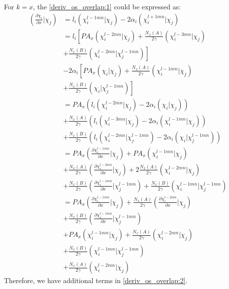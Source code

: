 For $k = x$, the \ref{deriv_os_overlap:1} could be expressed as:
\begin{equation}
 \begin{split}
 \left(\frac{\partial \chi_{i}}{\partial x}|\chi_{j}\right)  &= 
 l_{i}(\chi_{i}^{l-1mn}|\chi_{j}) - 2\alpha_{i} (\chi_{i}^{l+1mn}|\chi_{j}) \\
 &= l_{i}\left[ PA_{x}(\chi_{i}^{l-2mn}|\chi_{j}) + 
 \frac{N_{x}(A)}{2 \gamma}(\chi_{i}^{l-3mn}|\chi_{j})  \right. \\ 
 &+ \left. \frac{N_{x}(B)}{2 \gamma}(\chi_{i}^{l-2mn}|\chi_{j}^{l-1mn})
 \right] \\
 &-2\alpha_{i} \left[ PA_{x}(\chi_{i}|\chi_{j}) + 
 \frac{N_{x}(A)}{2 \gamma}(\chi_{i}^{l-1mn}|\chi_{j}) \right. \\ 
 &+ \left. \frac{N_{x}(B)}{2 \gamma}(\chi_{i}|\chi_{j}^{l-1mn})
 \right] \\
 &= PA_{x} \left( l_{i}(\chi_{i}^{l-2mn}|\chi_{j}) -2\alpha_{i} (\chi_{i}|\chi_{j}) 
 \right) \\
 &+ \frac{N_{x}(A)}{2 \gamma}\left(
 l_{i}(\chi_{i}^{l-3mn}|\chi_{j}) -2\alpha_{i} (\chi_{i}^{l-1mn}|\chi_{j})
 \right) \\
 &+ \frac{N_{x}(B)}{2 \gamma}\left(
 l_{i}(\chi_{i}^{l-2mn}|\chi_{j}^{l-1mn}) -2\alpha_{i} (\chi_{i}|\chi_{j}^{l-1mn})
 \right) \\
 &= PA_{x} (\frac{\partial \chi_{i}^{l-1mn}}{\partial x}|\chi_{j}) + 
 PA_{x} (\chi_{i}^{l-1mn}|\chi_{j}) \\
 &+ \frac{N_{x}(A)}{2 \gamma}(\frac{\partial \chi_{i}^{l-2mn}}{\partial x}|\chi_{j})
 + 2\frac{N_{x}(A)}{2 \gamma}(\chi_{i}^{l-2mn}|\chi_{j}) \\
 &+ \frac{N_{x}(B)}{2 \gamma}(\frac{\partial \chi_{i}^{l-1mn}}{\partial x}|\chi_{j}^{l-1mn})
 + \frac{N_{x}(B)}{2 \gamma}(\chi_{i}^{l-1mn}|\chi_{j}^{l-1mn}) \\
 &= PA_{x} (\frac{\partial \chi_{i}^{l-1mn}}{\partial x}|\chi_{j}) + 
 \frac{N_{x}(A)}{2 \gamma}(\frac{\partial \chi_{i}^{l-2mn}}{\partial x}|\chi_{j}) \\
 &+ \frac{N_{x}(B)}{2 \gamma}(\frac{\partial \chi_{i}^{l-1mn}}{\partial x}|\chi_{j}^{l-1mn}) \\
 &+ PA_{x} (\chi_{i}^{l-1mn}|\chi_{j}) + \frac{N_{x}(A)}{2 \gamma}(\chi_{i}^{l-2mn}|\chi_{j}) \\
 &+ \frac{N_{x}(B)}{2 \gamma}(\chi_{i}^{l-1mn}|\chi_{j}^{l-1mn}) \\
 &+ \frac{N_{x}(A)}{2 \gamma}(\chi_{i}^{l-2mn}|\chi_{j})
 \end{split}
 \label{deriv_os_overlap:2}
\end{equation}
Therefore, we have additional terms in \ref{deriv_os_overlap:2}.


